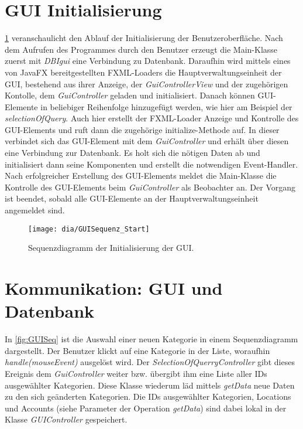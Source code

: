 \section{GUI Initialisierung}

\cref{fig:GUIStartSeq} veranschaulicht den Ablauf der Initialisierung der Benutzeroberfläche. Nach dem Aufrufen des Programmes durch den Benutzer erzeugt die Main-Klasse zuerst mit \emph{DBIgui} eine Verbindung zu Datenbank.
Daraufhin wird mittels eines von JavaFX bereitgestellten FXML-Loaders die Hauptverwaltungseinheit der GUI, bestehend aus ihrer Anzeige, der \emph{GuiControllerView} und der zugehörigen Kontolle, dem \emph{GuiController} geladen und initialisiert.
Danach können GUI-Elemente in beliebiger Reihenfolge hinzugefügt werden, wie hier am Beispiel der \emph{selectionOfQuery}.
Auch hier erstellt der FXML-Loader Anzeige und Kontrolle des GUI-Elements und ruft dann die zugehörige initialize-Methode auf.
In dieser verbindet sich das GUI-Element mit dem \emph{GuiController} und erhält über diesen eine Verbindung zur Datenbank. Es holt sich die nötigen Daten ab und initialisiert dann seine Komponenten und erstellt die notwendigen Event-Handler.
Nach erfolgreicher Erstellung des GUI-Elements meldet die  Main-Klasse die Kontrolle des GUI-Elements beim \emph{GuiController} als Beobachter an.
Der Vorgang ist beendet, sobald alle GUI-Elemente an der Hauptverwaltungseinheit angemeldet sind.

\begin{figure}[h!]
	\centering
	\texttt{[image: dia/GUISequenz\_Start]}
	\caption{Sequenzdiagramm der Initialisierung der GUI.}
	\label{fig:GUIStartSeq}
\end{figure}
\section{Kommunikation: GUI und Datenbank}
In \cref{fig:GUISeq} ist die Auswahl einer neuen Kategorie in einem Sequenzdiagramm dargestellt. Der Benutzer klickt auf eine Kategorie in der Liste, woraufhin \emph{handle(mouseEvent)} ausgelöst wird. Der \emph{SelectionOfQuerryController} gibt dieses Ereignis dem \emph{GuiController} weiter bzw. übergibt ihm eine Liste aller IDs ausgewählter Kategorien. Diese Klasse wiederum läd mittels \emph{getData} neue Daten zu den sich geänderten Kategorien. Die IDs ausgewählter Kategorien, Locations und Accounts (siehe Parameter der Operation \emph{getData}) sind dabei lokal in der Klasse \emph{GUIController} gespeichert.

